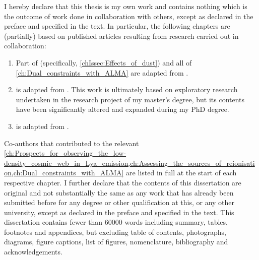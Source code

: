 
\begin{declaration}


    I hereby declare that this thesis is my own work and contains nothing which is the outcome of work done in collaboration with others, except as declared in the preface and specified in the text. In particular, the following chapters are (partially) based on published articles resulting from research carried out in collaboration:
    \begin{enumerate}[label=(\roman*)]
        \item Part of  (specifically, \cref{chIssec:Effects_of_dust}) and all of \cref{ch:Dual_constraints_with_ALMA} are adapted from \citet{2022MNRAS.515.1751W}.
        \item {} is adapted from \citet{2021A&A...650A..98W}. This work is ultimately based on exploratory research undertaken in the research project of my master's degree, but its contents have been significantly altered and expanded during my PhD degree.
        \item {} is adapted from \citet{2021MNRAS.508.1686W}.
    \end{enumerate}
    
    \noindent Co-authors that contributed to the relevant \cref{ch:Prospects_for_observing_the_low-density_cosmic_web_in_Lya_emission,ch:Assessing_the_sources_of_reionisation,ch:Dual_constraints_with_ALMA} are listed in full at the start of each respective chapter. I further declare that the contents of this dissertation are original and not substantially the same as any work that has already been submitted before for any degree or other qualification at this, or any other university, except as declared in the preface and specified in the text. This dissertation contains fewer than \num{60000} words including summary, tables, footnotes and appendices, but excluding table of contents, photographs, diagrams, figure captions, list of figures, nomenclature, bibliography and acknowledgements.
    

\end{declaration}

